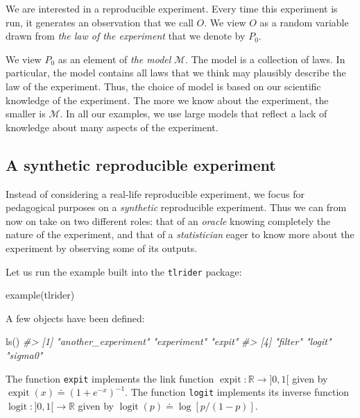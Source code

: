 \documentclass[
  11pt,
  openright,twoside]{book}
\newenvironment{Shaded}{\begin{snugshade}}{\end{snugshade}}
\newcommand{\CommentTok}[1]{\textcolor[rgb]{0.56,0.35,0.01}{\textit{#1}}}
\newcommand{\FunctionTok}[1]{\textcolor[rgb]{0.00,0.00,0.00}{#1}}
\newcommand{\NormalTok}[1]{#1}
\DeclareMathOperator{\expit}{expit}
\DeclareMathOperator{\logit}{logit}
\newcommand{\bbR}{\mathbb{R}}
\newcommand{\defq}{\doteq}
\newcommand{\calM}{\mathcal{M}}
\theoremstyle{definition}
\theoremstyle{definition}
\theoremstyle{definition}
\theoremstyle{definition}
\theoremstyle{remark}
\begin{document}
We are interested in a reproducible experiment. Every time this experiment is
run, it generates an observation that we call \(O\). We view \(O\) as a random
variable drawn from \emph{the law of the experiment} that we denote by \(P_{0}\).

We view \(P_{0}\) as an element of \emph{the model} \(\calM\). The model is a
collection of laws. In particular, the model contains all laws that we think
may plausibly describe the law of the experiment. Thus, the choice of model
is based on our scientific knowledge of the experiment. The more we know about
the experiment, the smaller is \(\calM\). In all our examples, we use large
models that reflect a lack of knowledge about many aspects of the experiment.

\hypertarget{synthetic-experiment}{%
\subsection{A synthetic reproducible experiment}\label{synthetic-experiment}}

Instead of considering a real-life reproducible experiment, we focus for
pedagogical purposes on a \emph{synthetic} reproducible experiment. Thus we can
from now on take on two different roles: that of an \emph{oracle} knowing
completely the nature of the experiment, and that of a \emph{statistician} eager to
know more about the experiment by observing some of its outputs.

Let us run the example built into the \texttt{tlrider} package:

\begin{Shaded}
\begin{Highlighting}[]
\FunctionTok{example}\NormalTok{(tlrider)}
\end{Highlighting}
\end{Shaded}

A few objects have been defined:

\begin{Shaded}
\begin{Highlighting}[]
\FunctionTok{ls}\NormalTok{()}
\CommentTok{\#\textgreater{} [1] "another\_experiment" "experiment"         "expit"             }
\CommentTok{\#\textgreater{} [4] "filter"             "logit"              "sigma0"}
\end{Highlighting}
\end{Shaded}

The function \texttt{expit} implements the link function \(\expit : \bbR \to ]0,1[\) given
by \(\expit(x) \defq (1 + e^{-x})^{-1}\). The function \texttt{logit} implements its
inverse function \(\logit : ]0,1[ \to \bbR\) given by \(\logit(p) \defq \log [p/(1-p)]\).
\end{document}
